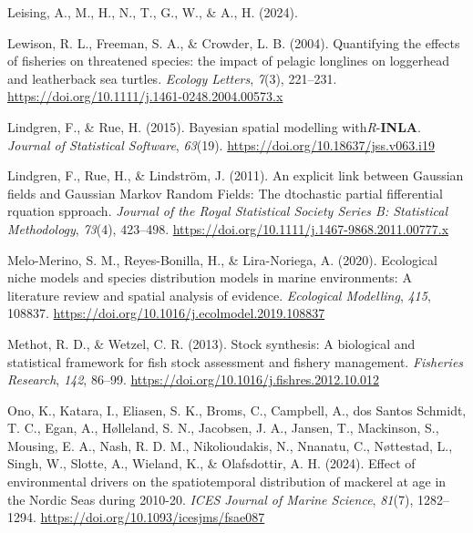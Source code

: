 \documentclass[
]{article}
\newlength{\cslhangindent}
\newlength{\cslentryspacingunit} %
\newenvironment{CSLReferences}[2] %
 {%
  \setlength{\parindent}{0pt}
  \ifodd #1
  \let\oldpar\par
  \def\par{\hangindent=\cslhangindent\oldpar}
  \fi
  \setlength{\parskip}{#2\cslentryspacingunit}
 }%
 {}
\begin{document}
\begin{CSLReferences}{1}{0}
\leavevmode{}%
Leising, A., M., H., N., T., G., W., \& A., H. (2024).

\leavevmode{}%
Lewison, R. L., Freeman, S. A., \& Crowder, L. B. (2004). {Quantifying
the effects of fisheries on threatened species: the impact of pelagic
longlines on loggerhead and leatherback sea turtles}. \emph{Ecology
Letters}, \emph{7}(3), 221--231.
\url{https://doi.org/10.1111/j.1461-0248.2004.00573.x}

\leavevmode{}%
Lindgren, F., \& Rue, H. (2015). {Bayesian spatial modelling
with{\emph{R}}-{\textbf{INLA}}}. \emph{Journal of Statistical Software},
\emph{63}(19). \url{https://doi.org/10.18637/jss.v063.i19}

\leavevmode{}%
Lindgren, F., Rue, H., \& Lindström, J. (2011). {An explicit link
between Gaussian fields and Gaussian Markov Random Fields: The
dtochastic partial fifferential rquation spproach}. \emph{Journal of the
Royal Statistical Society Series B: Statistical Methodology},
\emph{73}(4), 423--498.
\url{https://doi.org/10.1111/j.1467-9868.2011.00777.x}

\leavevmode{}%
Melo-Merino, S. M., Reyes-Bonilla, H., \& Lira-Noriega, A. (2020).
{Ecological niche models and species distribution models in marine
environments: A literature review and spatial analysis of evidence}.
\emph{Ecological Modelling}, \emph{415}, 108837.
\url{https://doi.org/10.1016/j.ecolmodel.2019.108837}

\leavevmode{}%
Methot, R. D., \& Wetzel, C. R. (2013). {Stock synthesis: A biological
and statistical framework for fish stock assessment and fishery
management}. \emph{Fisheries Research}, \emph{142}, 86--99.
\url{https://doi.org/10.1016/j.fishres.2012.10.012}

\leavevmode{}%
Ono, K., Katara, I., Eliasen, S. K., Broms, C., Campbell, A., dos Santos
Schmidt, T. C., Egan, A., Hølleland, S. N., Jacobsen, J. A., Jansen, T.,
Mackinson, S., Mousing, E. A., Nash, R. D. M., Nikolioudakis, N.,
Nnanatu, C., Nøttestad, L., Singh, W., Slotte, A., Wieland, K., \&
Olafsdottir, A. H. (2024). {Effect of environmental drivers on the
spatiotemporal distribution of mackerel at age in the Nordic Seas during
2010{-}20}. \emph{ICES Journal of Marine Science}, \emph{81}(7),
1282--1294. \url{https://doi.org/10.1093/icesjms/fsae087}


\end{CSLReferences}
\end{document}
